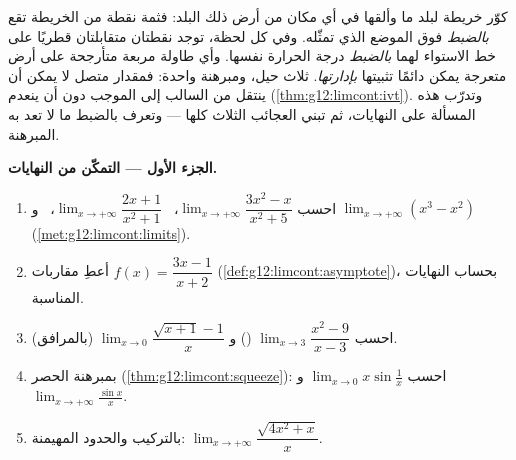 \begin{problem}
\label{pb:g12:limcont:1}
كوّر خريطة لبلد ما وألقها في أي مكان من أرض ذلك البلد: فثمة
نقطة من الخريطة تقع \emph{بالضبط} فوق الموضع الذي
تمثّله. وفي كل لحظة، توجد نقطتان متقابلتان قطريًا
على خط الاستواء لهما \emph{بالضبط} درجة الحرارة نفسها. وأي
طاولة مربعة متأرجحة على أرض متعرجة يمكن دائمًا تثبيتها
\emph{بإدارتها}. ثلاث حيل، ومبرهنة واحدة: فمقدار متصل
لا يمكن أن ينتقل من السالب إلى الموجب دون أن ينعدم
(\cref{thm:g12:limcont:ivt}). وتدرّب هذه المسألة على النهايات، ثم
تبني العجائب الثلاث كلها --- وتعرف بالضبط ما لا تعد به
المبرهنة.

\medskip
\noindent\textbf{الجزء الأول --- التمكّن من النهايات.}
\begin{enumerate}
  \item احسب $\lim_{x \to +\infty} \dfrac{3x^2 - x}{x^2 + 5}$،
        \ $\lim_{x \to +\infty} \dfrac{2x + 1}{x^2 + 1}$، \ و
        $\lim_{x \to +\infty} (x^3 - x^2)$
        (\cref{met:g12:limcont:limits}).
  \item أعطِ مقاربات
        $f(x) = \dfrac{3x - 1}{x + 2}$
        (\cref{def:g12:limcont:asymptote})، بحساب النهايات
        المناسبة.
  \item احسب $\lim_{x \to 3} \dfrac{x^2 - 9}{x - 3}$
        () و
        $\lim_{x \to 0} \dfrac{\sqrt{x + 1} - 1}{x}$
        (بالمرافق).
  \item بمبرهنة الحصر
        (\cref{thm:g12:limcont:squeeze}): احسب
        $\lim_{x \to 0} x \sin\frac1x$ و
        $\lim_{x \to +\infty} \frac{\sin x}{x}$.
  \item بالتركيب والحدود المهيمنة:
        $\lim_{x \to +\infty} \dfrac{\sqrt{4x^2 + x}}{x}$.
\end{enumerate}


\end{problem}

